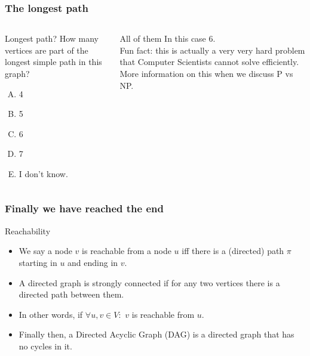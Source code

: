 \begin{frame}
	\frametitle{The longest path}
	\begin{columns}
			
		\begin{block}{Longest path?}
		\pause
			How many vertices are part of the longest simple path in this graph?
			\begin{enumerate}[A.]
				\item 4
				\item 5 
				\item 6
				\item 7
				\item I don't know.
			\end{enumerate}
		\end{block}
		\pause
		\vspace{-10pt}
		\begin{block}{All of them}
			In this case 6. \\
			Fun fact: this is actually a \alert{very very hard problem} that Computer Scientists cannot solve efficiently. More
			information on this when we discuss P vs NP.
		\end{block}
	\end{columns}
\end{frame}

\begin{frame}
	\frametitle{Finally we have reached the end}

		\begin{block}{Reachability}
			\begin{itemize}
				\item We say a node $v$ is \alert{reachable} from a node $u$ iff there is a (directed) path $\pi$ starting in
					$u$ and ending in $v$.
					\pause
				\item A directed graph is \alert{strongly connected} if for any two vertices there is a directed path between them.
				\item In other words, if $\forall u,v \in V:$ $v$ is reachable from $u$.
					\pause
				\item Finally then, a \alert{Directed Acyclic Graph (DAG)}  is a directed graph that has no cycles in it.
			\end{itemize}
		\end{block}	
\end{frame}

